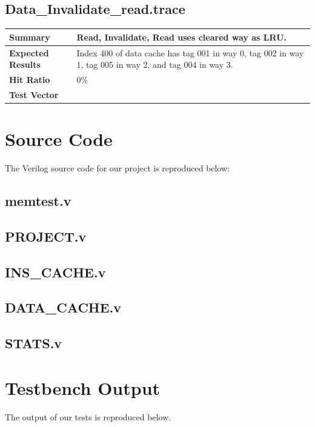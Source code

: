 \documentclass{article}
\begin{document}
\subsection{Data\_Invalidate\_read.trace}
\begin{tabular}{|p{1.2in}|p{3.8in}|}
  \hline
  \textbf{Summary} & Read, Invalidate, Read uses cleared way as LRU.\\
  \hline
  \textbf{Expected Results} & Index 400 of data cache has tag 001 in way 0, tag
                  002 in way 1, tag 005 in way 2, and tag 004 in way 3.\\
  \hline
  \textbf{Hit Ratio} & 0\%\\
  \hline
  \textbf{Test Vector} &  \\
  \hline
\end{tabular}

\newpage

\section {Source Code}

The Verilog source code for our project is reproduced below:

\subsection{memtest.v}

\newpage 

\subsection{PROJECT.v}

\newpage 

\subsection{INS\_CACHE.v}

\newpage 

\subsection{DATA\_CACHE.v}

\newpage 

\subsection{STATS.v}

\newpage 

\section{Testbench Output}

The output of our tests is reproduced below. 


\end{document}
